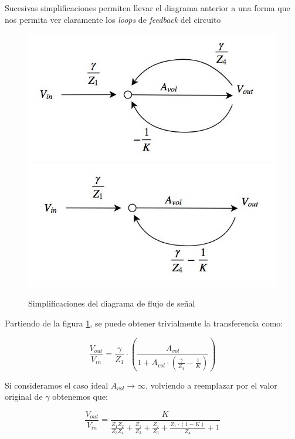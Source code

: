 \documentclass[../../tc_tp5_main.tex]{subfiles}
\begin{document}
Sucesivas simplificaciones permiten llevar el diagrama anterior a una forma que nos permita ver claramente los \textit{loops} de \textit{feedback} del circuito

\begin{figure}[H]
	\centering
	\includegraphics[scale=0.7]{imagenes/tc_tp1_ej1_df_2.jpg}\\
	\includegraphics[scale=0.7]{imagenes/tc_tp1_ej1_df_3.jpg}	
	\caption{Simplificaciones del diagrama de flujo de se\~nal}
	\label{fig:1-flujo-de-senal}
\end{figure}

Partiendo de la figura \ref{fig:1-flujo-de-senal}, se puede obtener trivialmente la transferencia como:

\begin{equation}
	\frac{V_{out}}{V_{in}} = \frac{\gamma}{Z_1} \cdot \left( \frac{A_{vol}}{1 + A_{vol} \cdot \left( \frac{\gamma}{Z_4} - \frac{1}{K} \right)} \right)
	\label{eq:1-tf-sk-generica-avol}
\end{equation}

Si consideramos el caso ideal $A_{vol} \to \infty$, volviendo a reemplazar por el valor original de $\gamma$ obtenemos que:

\begin{equation}
	\frac{V_{out}}{V_{in}} = \frac{K}{ \frac{Z_1 Z_2}{Z_3 Z_4} + \frac{Z_1}{Z_3} + \frac{Z_2}{Z_3} + \frac{Z_1 \cdot (1-K)}{Z_4} + 1} 
	\label{eq:1-tf-sk-generica}
\end{equation}
\end{document}
